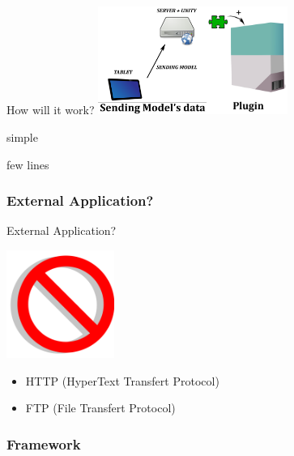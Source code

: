 \documentclass[a4paper,10pt]{beamer}
\begin{document}
			\begin{frame}{How will it work?}
				\includegraphics[height=100pt]{images/network/sending_model.png}\hspace{50pt}\pause\includegraphics[height=100pt]{images/network/plugin.png}
				
				\hspace{150pt}
				simple

				\hspace{150pt}
				few lines
				
			\end{frame}
			
			\subsubsection{External Application?}
			
			\begin{frame}{External Application?}
				\centerline{\includegraphics[height=100pt]{images/network/no.png}}
				\begin{itemize}
					\item HTTP (HyperText Transfert Protocol)
					\item FTP (File Transfert Protocol)
				\end{itemize}
			\end{frame}
			
			\subsubsection{Framework}
			
\end{document}
